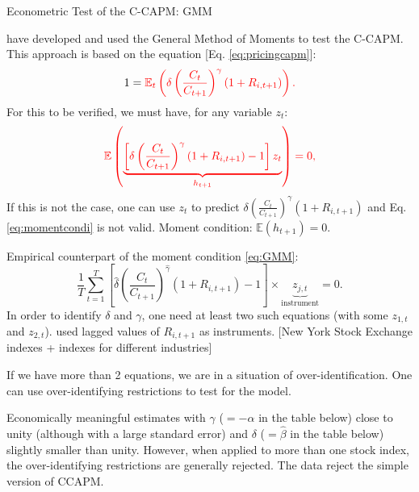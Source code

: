 \documentclass[
  12pt,
]{book}
\theoremstyle{definition}
\theoremstyle{definition}
\theoremstyle{definition}
\theoremstyle{definition}
\theoremstyle{remark}
\begin{document}
Econometric Test of the C-CAPM: GMM

\citet{Hansen_Singleton_1982} have developed and used the General Method of Moments to test the C-CAPM.
This approach is based on the equation {[}Eq. \eqref{eq:pricingcapm}{]}:
\begin{equation}
1 = \color{red}{\mathbb{E}_t}\left( \delta \left(\frac{C_t}{C_{t+1}}\right)^\gamma (1+R_{i,t+1})\right).\label{eq:momentcondi}
\end{equation}
For this to be verified, we must have, for any variable \(z_t\):
\begin{equation}
\color{red}{\mathbb{E}}\left( \underbrace{\left[\delta \left(\frac{C_t}{C_{t+1}}\right)^\gamma (1+R_{i,t+1}) - 1\right] z_t}_{h_{t+1}}\right) = 0,\label{eq:GMM}
\end{equation}
If this is not the case, one can use \(z_t\) to predict \(\delta \left(\frac{C_t}{C_{t+1}}\right)^\gamma (1+R_{i,t+1})\) and Eq. \eqref{eq:momentcondi} is not valid. Moment condition: \(\mathbb{E}(h_{t+1})=0\).

Empirical counterpart of the moment condition \eqref{eq:GMM}:
\begin{equation}
\frac{1}{T}\sum_{t=1}^{T} \left[\hat\delta \left(\frac{C_t}{C_{t+1}}\right)^{\hat\gamma} (1+R_{i,t+1}) - 1\right] \times\underbrace{z_{j,t}}_{\mbox{instrument}} = 0.
\end{equation}
In order to identify \(\delta\) and \(\gamma\), one need at least two such equations (with some \(z_{1,t}\) and \(z_{2,t}\)).
\citet{Hansen_Singleton_1982} used lagged values of \(R_{i,t+1}\) as instruments. {[}New York Stock Exchange indexes + indexes for different industries{]}

If we have more than 2 equations, we are in a situation of over-identification. One can use over-identifying restrictions to test for the model.

Economically meaningful estimates with \(\gamma\) (\(=-\hat\alpha\) in the table below) close to unity (although with a large standard error) and \(\delta\) (\(=\hat\beta\) in the table below) slightly smaller than unity.
However, when applied to more than one stock index, the over-identifying restrictions are generally rejected. The data reject the simple version of CCAPM.
\end{document}
